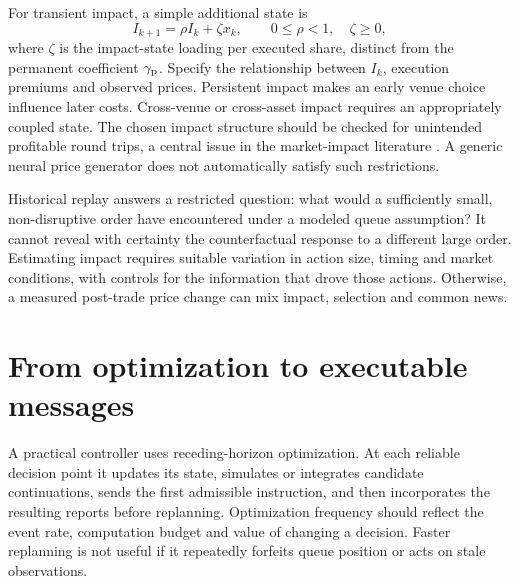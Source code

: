 \documentclass[11pt]{article}
\numberwithin{equation}{section}
\theoremstyle{definition}
\theoremstyle{remark}
\theoremstyle{definition}
\begin{document}
For transient impact, a simple additional state is
\begin{equation}\label{eq:impactstate}
 I_{k+1}=\rho I_k+\zeta x_k,\qquad 0\leq\rho<1,\quad\zeta\geq0,
\end{equation}
where $\zeta$ is the impact-state loading per executed share, distinct from
the permanent coefficient $\gamma_{\rm p}$. Specify the relationship between
$I_k$, execution premiums and observed
prices. Persistent impact makes an early venue choice influence later costs.
Cross-venue or cross-asset impact requires an appropriately coupled state.
The chosen impact structure should be checked for unintended profitable
round trips, a central issue in the market-impact literature
\citep{gatheral2010,schneider2019}. A generic neural price generator does not
automatically satisfy such restrictions.

Historical replay answers a restricted question: what would a sufficiently
small, non-disruptive order have encountered under a modeled queue assumption?
It cannot reveal with certainty the counterfactual response to a different
large order. Estimating impact requires suitable variation in action size,
timing and market conditions, with controls for the information that drove
those actions. Otherwise, a measured post-trade price change can mix impact,
selection and common news.

\section{From optimization to executable messages}\label{sec:algorithm}

A practical controller uses receding-horizon optimization. At each reliable
decision point it updates its state, simulates or integrates candidate
continuations, sends the first admissible instruction, and then incorporates
the resulting reports before replanning. Optimization frequency should reflect
the event rate, computation budget and value of changing a decision. Faster
replanning is not useful if it repeatedly forfeits queue position or acts on
stale observations.
\end{document}
